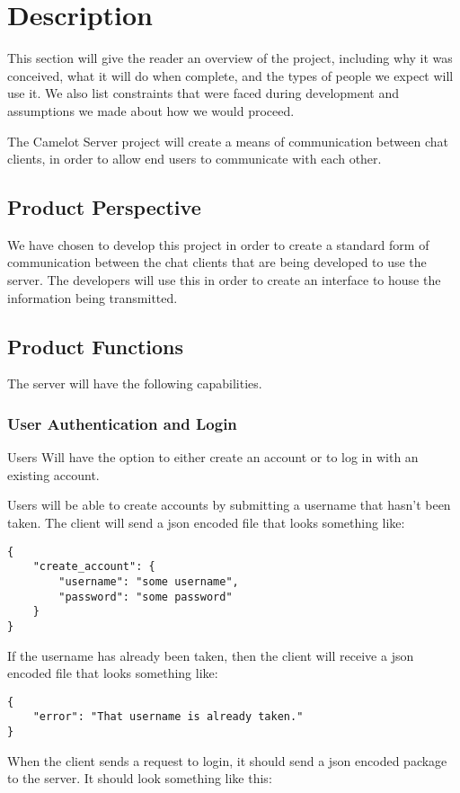 \chapter{Description}\label{description}
This section will give the reader an overview of the project, including why it was conceived, what it will do when complete, and the types of people we expect will use it. We also list constraints that were faced during development and assumptions we made about how we would proceed.

The Camelot Server project will create a means of communication between chat clients, in order to allow end users to communicate with each other.

\section{Product Perspective}\label{product-perspective}
We have chosen to develop this project in order to create a standard form of communication between the chat clients that are being developed to use the server. The developers will use this in order to create an interface to house the information being transmitted.

\section{Product Functions}\label{product-functions}
The server will have the following capabilities.

\subsection{User Authentication and Login}
Users Will have the option to either create an account or to log in with an existing account.

Users will be able to create accounts by submitting a username that hasn't been taken. The client will send a \gls{json} encoded file that looks something like:

\begin{lstlisting}[style=json]
{
    "create_account": {
        "username": "some username",
        "password": "some password"
    }
}
\end{lstlisting}

If the username has already been taken, then the client will receive a \gls{json} encoded file that looks something like:

\begin{lstlisting}[style=json]
{
    "error": "That username is already taken."
}
\end{lstlisting}
When the client sends a request to login, it should send a \gls{json} encoded package to the server. It should look something like this:

